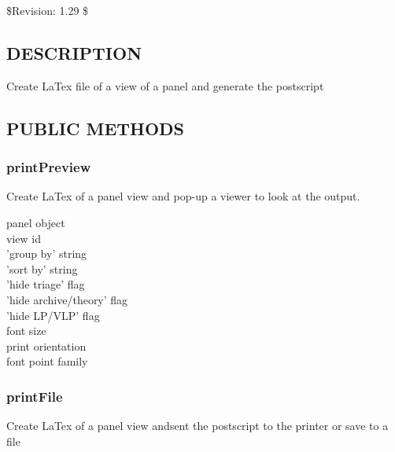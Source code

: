 \documentclass{article}
\begin{document}
\$Revision: 1.29 \$

\subsection*{DESCRIPTION\label{Print_DESCRIPTION}}


Create LaTex file of a view of a panel and generate the postscript

\subsection*{PUBLIC METHODS\label{Print_PUBLIC_METHODS}}
\subsubsection*{printPreview\label{Print_printPreview}}


Create LaTex of a panel view and pop-up a viewer to look at the output.

\begin{description}

\item[{panel object}] \mbox{}
\item[{view id}] \mbox{}
\item[{'group by' string}] \mbox{}
\item[{'sort by' string}] \mbox{}
\item[{'hide triage' flag}] \mbox{}
\item[{'hide archive/theory' flag}] \mbox{}
\item[{'hide LP/VLP' flag}] \mbox{}
\item[{font size}] \mbox{}
\item[{print orientation}] \mbox{}
\item[{font point family}] \mbox{}\end{description}
\subsubsection*{printFile\label{Print_printFile}}


Create LaTex of a panel view andsent the postscript to the printer or save
to a file
\end{document}
